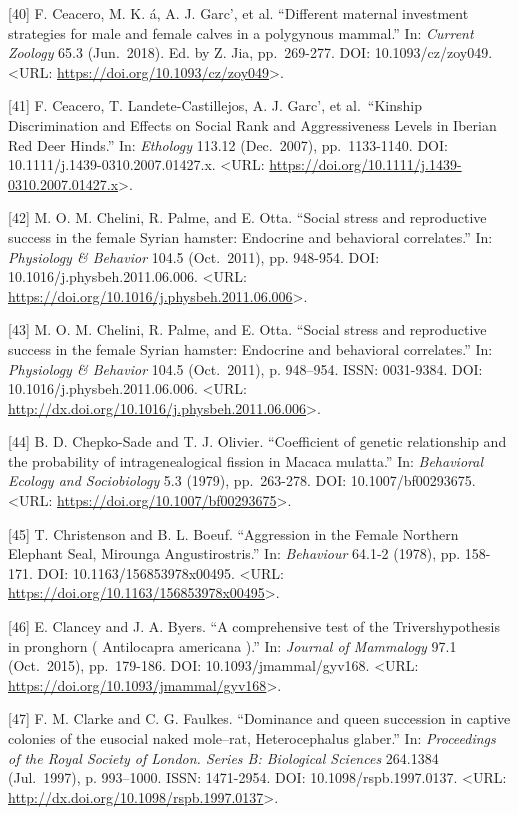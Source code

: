 \documentclass[
]{article}
\begin{document}
{[}40{]} F. Ceacero, M. K. á, A. J. Garc'\ia, et al. ``Different
maternal investment strategies for male and female calves in a
polygynous mammal.'' In: \emph{Current Zoology} 65.3 (Jun.~2018). Ed. by
Z. Jia, pp.~269-277. DOI: 10.1093/cz/zoy049. \textless URL:
\url{https://doi.org/10.1093/cz/zoy049}\textgreater.

{[}41{]} F. Ceacero, T. Landete-Castillejos, A. J. Garc'\ia, et
al.~``Kinship Discrimination and Effects on Social Rank and
Aggressiveness Levels in Iberian Red Deer Hinds.'' In: \emph{Ethology}
113.12 (Dec.~2007), pp.~1133-1140. DOI:
10.1111/j.1439-0310.2007.01427.x. \textless URL:
\url{https://doi.org/10.1111/j.1439-0310.2007.01427.x}\textgreater.

{[}42{]} M. O. M. Chelini, R. Palme, and E. Otta. ``Social stress and
reproductive success in the female Syrian hamster: Endocrine and
behavioral correlates.'' In: \emph{Physiology \& Behavior} 104.5
(Oct.~2011), pp. 948-954. DOI: 10.1016/j.physbeh.2011.06.006.
\textless URL:
\url{https://doi.org/10.1016/j.physbeh.2011.06.006}\textgreater.

{[}43{]} M. O. M. Chelini, R. Palme, and E. Otta. ``Social stress and
reproductive success in the female Syrian hamster: Endocrine and
behavioral correlates.'' In: \emph{Physiology \& Behavior} 104.5
(Oct.~2011), p. 948--954. ISSN: 0031-9384. DOI:
10.1016/j.physbeh.2011.06.006. \textless URL:
\url{http://dx.doi.org/10.1016/j.physbeh.2011.06.006}\textgreater.

{[}44{]} B. D. Chepko-Sade and T. J. Olivier. ``Coefficient of genetic
relationship and the probability of intragenealogical fission in Macaca
mulatta.'' In: \emph{Behavioral Ecology and Sociobiology} 5.3 (1979),
pp.~263-278. DOI: 10.1007/bf00293675. \textless URL:
\url{https://doi.org/10.1007/bf00293675}\textgreater.

{[}45{]} T. Christenson and B. L. Boeuf. ``Aggression in the Female
Northern Elephant Seal, Mirounga Angustirostris.'' In: \emph{Behaviour}
64.1-2 (1978), pp. 158-171. DOI: 10.1163/156853978x00495. \textless URL:
\url{https://doi.org/10.1163/156853978x00495}\textgreater.

{[}46{]} E. Clancey and J. A. Byers. ``A comprehensive test of the
Trivers\textendashWillard hypothesis in pronghorn ( Antilocapra
americana ).'' In: \emph{Journal of Mammalogy} 97.1 (Oct.~2015),
pp.~179-186. DOI: 10.1093/jmammal/gyv168. \textless URL:
\url{https://doi.org/10.1093/jmammal/gyv168}\textgreater.

{[}47{]} F. M. Clarke and C. G. Faulkes. ``Dominance and queen
succession in captive colonies of the eusocial naked mole--rat,
Heterocephalus glaber.'' In: \emph{Proceedings of the Royal Society of
London. Series B: Biological Sciences} 264.1384 (Jul.~1997), p.
993--1000. ISSN: 1471-2954. DOI: 10.1098/rspb.1997.0137. \textless URL:
\url{http://dx.doi.org/10.1098/rspb.1997.0137}\textgreater.
\end{document}
